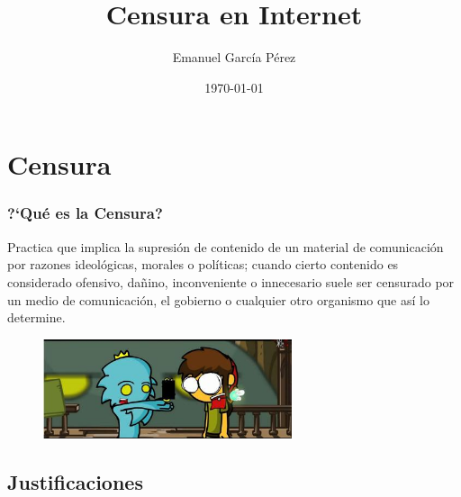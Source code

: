 \documentclass{beamer}
\title{\textbf{Censura en Internet}}
\author{Emanuel Garc\'ia P\'erez}
\date{\today}
\begin{document}
\frame[allowframebreaks]{\titlepage}
\section[Contenidos]{}
\frame{
\transdissolve[duration=0.2]
\tableofcontents
}


\section{Censura}
\frame
{
\transdissolve[duration=0.2]
\frametitle{?`Qu\'e es la Censura?}
Practica que implica la supresi\'on de contenido de un material de comunicaci\'on por razones ideol\'ogicas, morales o pol\'iticas; cuando cierto contenido es considerado ofensivo, da\~nino, inconveniente o innecesario suele ser censurado por un medio de comunicaci\'on, el gobierno o cualquier otro organismo que as\'i lo determine.
\begin{figure}
  \centering
    \includegraphics[width=0.65\textwidth]{cens_dk.jpg}
  \label{fig:ejemplo}
\end{figure}
}

\subsection{Justificaciones}
\end{document}
